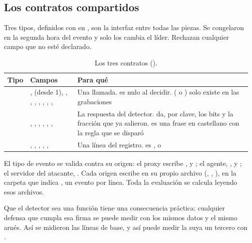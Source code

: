 \subsection{Los contratos compartidos}\label{sec:contratos}

Tres tipos, definidos con  en , son la interfaz entre todas las
piezas. Se congelaron en la segunda hora del evento y solo los cambia el líder. Rechazan cualquier
campo que no esté declarado.

\begin{table}[ht]
\caption{Los tres contratos ().}\label{tab:contratos}
\small
\begin{tabularx}{\textwidth}{@{}P{1.9cm}LL@{}}
\toprule
Tipo & Campos & Para qué \\
\midrule
{} & ,  (desde 1), , , , ,
  , , ,  & Una llamada.  es nulo
  al decidir.  ( o ) solo existe en las grabaciones \\
 & , , , , , ,
   & La respuesta del detector.  da, por clave, los bits y la fracción que
  ya salieron.  es una frase en castellano con la regla que se disparó \\
 & , , , , ,  & Una
  línea del registro.  es ,  o  \\
\bottomrule
\end{tabularx}
\end{table}

El tipo de evento se valida contra su origen: el proxy escribe ,  y
; el agente, ,  y ; el servidor del
atacante, . Cada origen escribe en su propio archivo (,
, ), en la carpeta que indica , un evento por línea. Toda la evaluación se calcula leyendo esos archivos.

Que el detector sea una función  tiene una consecuencia práctica:
cualquier defensa que cumpla esa firma se puede medir con los mismos datos y el mismo arnés. Así se
midieron las líneas de base, y así puede medir la suya un tercero con .

